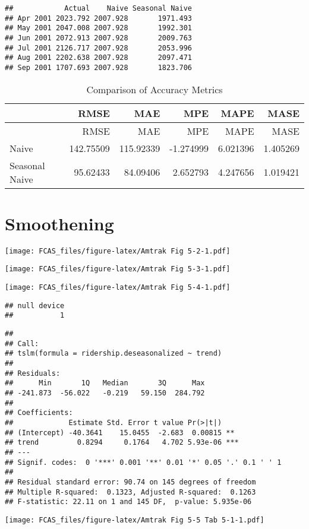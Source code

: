 \documentclass[]{article}
\begin{document}
\begin{verbatim}
##            Actual    Naive Seasonal Naive
## Apr 2001 2023.792 2007.928       1971.493
## May 2001 2047.008 2007.928       1992.301
## Jun 2001 2072.913 2007.928       2009.763
## Jul 2001 2126.717 2007.928       2053.996
## Aug 2001 2202.638 2007.928       2097.471
## Sep 2001 1707.693 2007.928       1823.706
\end{verbatim}

\begin{longtable}[]{@{}lrrrrr@{}}
\caption{Comparison of Accuracy Metrics}\tabularnewline
\toprule
& RMSE & MAE & MPE & MAPE & MASE\tabularnewline
\midrule
\endfirsthead
\toprule
& RMSE & MAE & MPE & MAPE & MASE\tabularnewline
\midrule
\endhead
Naive & 142.75509 & 115.92339 & -1.274999 & 6.021396 &
1.405269\tabularnewline
Seasonal Naive & 95.62433 & 84.09406 & 2.652793 & 4.247656 &
1.019421\tabularnewline
\bottomrule
\end{longtable}

\section{Smoothening}\label{smoothening}

\texttt{[image: FCAS\_files/figure-latex/Amtrak Fig 5-2-1.pdf]}

\texttt{[image: FCAS\_files/figure-latex/Amtrak Fig 5-3-1.pdf]}

\texttt{[image: FCAS\_files/figure-latex/Amtrak Fig 5-4-1.pdf]}

\begin{verbatim}
## null device 
##           1
\end{verbatim}

\begin{verbatim}
## 
## Call:
## tslm(formula = ridership.deseasonalized ~ trend)
## 
## Residuals:
##      Min       1Q   Median       3Q      Max 
## -241.873  -56.022   -0.219   59.150  284.792 
## 
## Coefficients:
##             Estimate Std. Error t value Pr(>|t|)    
## (Intercept) -40.3641    15.0455  -2.683  0.00815 ** 
## trend         0.8294     0.1764   4.702 5.93e-06 ***
## ---
## Signif. codes:  0 '***' 0.001 '**' 0.01 '*' 0.05 '.' 0.1 ' ' 1
## 
## Residual standard error: 90.74 on 145 degrees of freedom
## Multiple R-squared:  0.1323, Adjusted R-squared:  0.1263 
## F-statistic: 22.11 on 1 and 145 DF,  p-value: 5.935e-06
\end{verbatim}

\texttt{[image: FCAS\_files/figure-latex/Amtrak Fig 5-5 Tab 5-1-1.pdf]}
\end{document}
